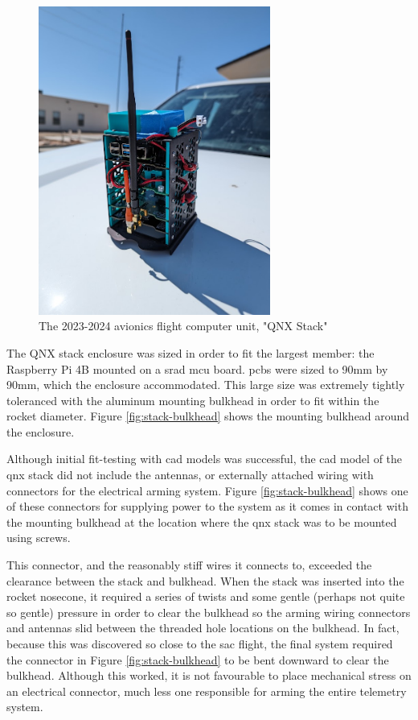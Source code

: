 \begin{figure}[H]
    \center
    \includegraphics[width=3in]{assets/images/stack.jpg}
    \caption{The 2023-2024 avionics flight computer unit, "QNX Stack"}
    \label{fig:preflight-stack}
\end{figure}

The QNX stack enclosure was sized in order to fit the largest member: the Raspberry Pi 4B mounted on a \gls{srad}
\gls{mcu} board. \Glspl{pcb} were sized to 90mm by 90mm, which the enclosure accommodated. This large size was
extremely tightly toleranced with the aluminum mounting bulkhead in order to fit within the rocket diameter. Figure
\ref{fig:stack-bulkhead} shows the mounting bulkhead around the enclosure.

Although initial fit-testing with \gls{cad} models was successful, the \gls{cad} model of the \gls{qnx} stack did not
include the antennas, or externally attached wiring with connectors for the electrical arming system. Figure
\ref{fig:stack-bulkhead} shows one of these connectors for supplying power to the system as it comes in contact with
the mounting bulkhead at the location where the \gls{qnx} stack was to be mounted using screws.

This connector, and the reasonably stiff wires it connects to, exceeded the clearance between the stack and bulkhead.
When the stack was inserted into the rocket nosecone, it required a series of twists and some gentle (perhaps not quite
so gentle) pressure in order to clear the bulkhead so the arming wiring connectors and antennas slid between the
threaded hole locations on the bulkhead. In fact, because this was discovered so close to the \gls{sac} flight, the
final system required the connector in Figure \ref{fig:stack-bulkhead} to be bent downward to clear the bulkhead.
Although this worked, it is not favourable to place mechanical stress on an electrical connector, much less one
responsible for arming the entire telemetry system.

